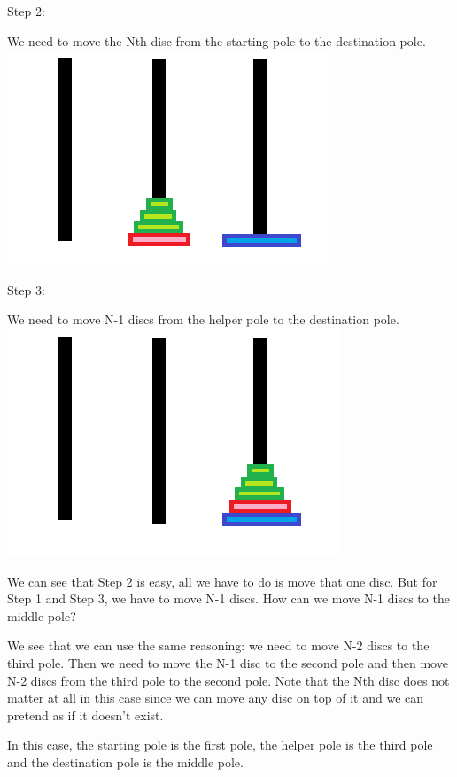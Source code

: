 \documentclass[11pt,oneside]{book}
\makeatletter
\def\maxwidth#1{\ifdim\Gin@nat@width>#1 #1\else\Gin@nat@width\fi}
\makeatother
\begin{document}
Step 2:

We need to move the Nth disc from the starting pole to the destination pole.
\vspace{5px}\includegraphics[width=\maxwidth{\textwidth}]{hanoi3.png}

Step 3:

We need to move N-1 discs from the helper pole to the destination pole.
\vspace{5px}\includegraphics[width=\maxwidth{\textwidth}]{hanoi4.png}

We can see that Step 2 is easy, all we have to do is move that one disc. But for Step 1 and Step 3, we have to move N-1 discs. How can we move N-1 discs to the middle pole?

We see that we can use the same reasoning: we need to move N-2 discs to the third pole. Then we need to move the N-1 disc to the second pole and then move N-2 discs from the third pole to the second pole. Note that the Nth disc does not matter at all in this case since we can move any disc on top of it and we can pretend as if it doesn't exist.

In this case, the starting pole is the first pole, the helper pole is the third pole and the destination pole is the middle pole.
\end{document}
